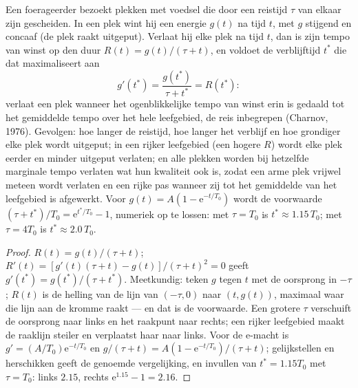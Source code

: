 \begin{theorem}\label{thm:b3:behavioural-ecology:mvt}
Een foerageerder bezoekt plekken met voedsel die door een reistijd
$\tau$ van elkaar zijn gescheiden. In een plek wint hij een energie
$g(t)$ na tijd $t$, met $g$ stijgend en concaaf (de plek raakt
uitgeput). Verlaat hij elke plek na tijd $t$, dan is zijn tempo van
winst op den duur $R(t) = g(t)/(\tau + t)$, en voldoet de verblijftijd
$t^{*}$ die dat maximaliseert aan
\[
g'(t^{*}) = \frac{g(t^{*})}{\tau + t^{*}} = R(t^{*}) :
\]
verlaat een plek wanneer het ogenblikkelijke tempo van winst erin is
gedaald tot het gemiddelde tempo over het hele leefgebied, de reis
inbegrepen (Charnov, 1976). Gevolgen: hoe langer de reistijd, hoe
langer het verblijf en hoe grondiger elke plek wordt uitgeput; in een
rijker leefgebied (een hogere $R$) wordt elke plek eerder en minder
uitgeput verlaten; en alle plekken worden bij hetzelfde marginale tempo
verlaten wat hun kwaliteit ook is, zodat een arme plek vrijwel meteen
wordt verlaten en een rijke pas wanneer zij tot het gemiddelde van het
leefgebied is afgewerkt. Voor $g(t) = A(1 -
\mathrm{e}^{-t/T_{0}})$ wordt de voorwaarde $(\tau + t^{*})/T_{0} =
\mathrm{e}^{t^{*}/T_{0}} - 1$, numeriek op te lossen: met $\tau = T_{0}$
is $t^{*} \approx 1.15\,T_{0}$; met $\tau = 4T_{0}$ is $t^{*} \approx
2.0\,T_{0}$.
\end{theorem}
\begin{proof}
$R(t) = g(t)/(\tau + t)$; $R'(t) = [g'(t)(\tau + t) - g(t)]/(\tau +
t)^{2} = 0$ geeft $g'(t^{*}) = g(t^{*})/(\tau + t^{*})$. Meetkundig:
teken $g$ tegen $t$ met de oorsprong in $-\tau$; $R(t)$ is de helling
van de lijn van $(-\tau, 0)$ naar $(t, g(t))$, maximaal waar die lijn
aan de kromme raakt --- en dat is de voorwaarde. Een grotere $\tau$
verschuift de oorsprong naar links en het raakpunt naar rechts; een
rijker leefgebied maakt de raaklijn steiler en verplaatst haar naar
links. Voor de e-macht is $g' = (A/T_{0})
\mathrm{e}^{-t/T_{0}}$ en $g/(\tau + t) = A(1 - \mathrm{e}^{-t/T_{0}})/
(\tau + t)$; gelijkstellen en herschikken geeft de genoemde
vergelijking, en invullen van $t^{*} = 1.15T_{0}$ met $\tau = T_{0}$:
links $2.15$, rechts $\mathrm{e}^{1.15} - 1 = 2.16$.
\end{proof}

